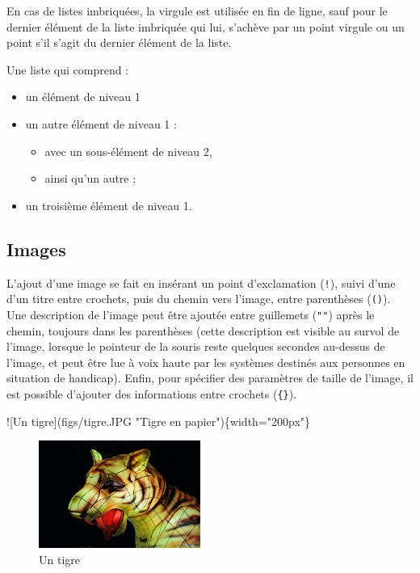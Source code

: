 \documentclass[
  11pt,
]{book}
\newenvironment{Shaded}{\begin{snugshade}}{\end{snugshade}}
\newcommand{\AlertTok}[1]{\textcolor[rgb]{0.94,0.16,0.16}{#1}}
\newcommand{\NormalTok}[1]{#1}
\providecommand{\tightlist}{%
  \setlength{\itemsep}{0pt}\setlength{\parskip}{0pt}}
\numberwithin{equation}{section}
\numberwithin{countremarque}{section}
\newenvironment{notebox}{
  \begin{tcolorbox}[breakable, colback=jaune,coltext=black,
                  colframe=grisfonce]}
 {\end{tcolorbox}}
\begin{document}
\begin{notebox}
En cas de listes imbriquées, la virgule est utilisée en fin de ligne, sauf pour le dernier élément de la liste imbriquée qui lui, s'achève par un point virgule ou un point s'il s'agit du dernier élément de la liste.

Une liste qui comprend :

\begin{itemize}
\item
  un élément de niveau 1
\item
  un autre élément de niveau 1 :

  \begin{itemize}
  \tightlist
  \item
    avec un sous-élément de niveau 2,
  \item
    ainsi qu'un autre ;
  \end{itemize}
\item
  un troisième élément de niveau 1.
\end{itemize}

\end{notebox}

\hypertarget{images}{%
\subsection{Images}\label{images}}

L'ajout d'une image se fait en insérant un point d'exclamation (\texttt{!}), suivi d'une d'un titre entre crochets, puis du chemin vers l'image, entre parenthèses (\texttt{()}). Une description de l'image peut être ajoutée entre guillemets (\texttt{""}) après le chemin, toujours dans les parenthèses (cette description est visible au survol de l'image, lorsque le pointeur de la souris reste quelques secondes au-dessus de l'image, et peut être lue à voix haute par les systèmes destinés aux personnes en situation de handicap). Enfin, pour spécifier des paramètres de taille de l'image, il est possible d'ajouter des informations entre crochets (\texttt{\{\}}).

\begin{Shaded}
\begin{Highlighting}[]
\AlertTok{![Un tigre](figs/tigre.JPG "Tigre en papier")}\NormalTok{\{width="200px"\}}
\end{Highlighting}
\end{Shaded}

\begin{figure}
\centering
\includegraphics[width=2.08333in,height=\textheight]{figs/tigre.JPG}
\caption{Un tigre}
\end{figure}
\end{document}
